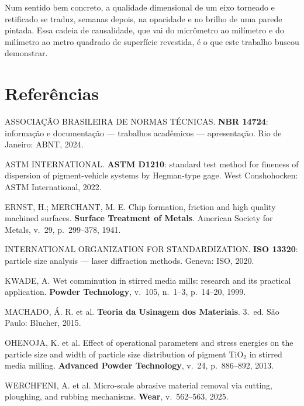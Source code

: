 \documentclass[
  12pt,
  a4paper,
  oneside,
  brazil,
  chapter=TITLE
]{article}
\newcommand{\secbreak}{\clearpage}
\let\oldsection\section
\renewcommand{\section}{\secbreak\oldsection}
\begin{document}
Num sentido bem concreto, a qualidade dimensional de um eixo torneado e
retificado se traduz, semanas depois, na opacidade e no brilho de uma parede
pintada. Essa cadeia de causalidade, que vai do micrômetro ao milímetro e do
milímetro ao metro quadrado de superfície revestida, é o que este trabalho
buscou demonstrar.


\section{Referências}\label{referencias}

\noindent
ASSOCIAÇÃO BRASILEIRA DE NORMAS TÉCNICAS. \textbf{NBR 14724}:
informação e documentação --- trabalhos acadêmicos --- apresentação.
Rio de Janeiro: ABNT, 2024.

\vspace{0.5em}
\noindent
ASTM INTERNATIONAL. \textbf{ASTM D1210}: standard test method for
fineness of dispersion of pigment-vehicle systems by Hegman-type gage.
West Conshohocken: ASTM International, 2022.

\vspace{0.5em}
\noindent
ERNST, H.; MERCHANT, M. E. Chip formation, friction and high quality
machined surfaces. \textbf{Surface Treatment of Metals}. American
Society for Metals, v.~29, p.~299--378, 1941.

\vspace{0.5em}
\noindent
INTERNATIONAL ORGANIZATION FOR STANDARDIZATION. \textbf{ISO 13320}:
particle size analysis --- laser diffraction methods. Geneva: ISO, 2020.

\vspace{0.5em}
\noindent
KWADE, A. Wet comminution in stirred media mills: research and its
practical application. \textbf{Powder Technology}, v.~105, n.~1--3,
p.~14--20, 1999.

\vspace{0.5em}
\noindent
MACHADO, Á. R. et al. \textbf{Teoria da Usinagem dos Materiais}. 3.~ed.
São Paulo: Blucher, 2015.

\vspace{0.5em}
\noindent
OHENOJA, K. et al. Effect of operational parameters and stress energies
on the particle size and width of particle size distribution of pigment
TiO$_2$ in stirred media milling. \textbf{Advanced Powder Technology},
v.~24, p.~886--892, 2013.

\vspace{0.5em}
\noindent
WERCHFENI, A. et al. Micro-scale abrasive material removal via cutting,
ploughing, and rubbing mechanisms. \textbf{Wear}, v.~562--563, 2025.
\end{document}
